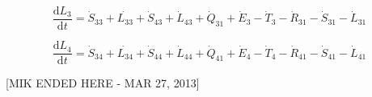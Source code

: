 \documentclass[authoryear,preprint,review,12pt]{elsarticle}
\begin{document}
\begin{equation} \label{eq:D-embodied_acct_3}
	\frac{\mathrm{d}L_{3}}{\mathrm{d}t} 	 = \dot{S}_{33} + \dot{L_33} + \dot{S}_{43} + \dot{L}_{43} + \dot{Q}_{31} + \dot{E}_{3} - \dot{T}_{3} - \dot{R}_{31} - \dot{S}_{31} - \dot{L}_{31}
\end{equation}

\begin{equation} \label{eq:D-embodied_acct_4}
	\frac{\mathrm{d}L_{4}}{\mathrm{d}t} 	 = \dot{S}_{34} + \dot{L_34} + \dot{S}_{44} + \dot{L}_{44} + \dot{Q}_{41} + \dot{E}_{4} - \dot{T}_{4} - \dot{R}_{41} - \dot{S}_{41} - \dot{L}_{41}
\end{equation}

[MIK ENDED HERE - MAR 27, 2013]

%
%
%
\end{document}

